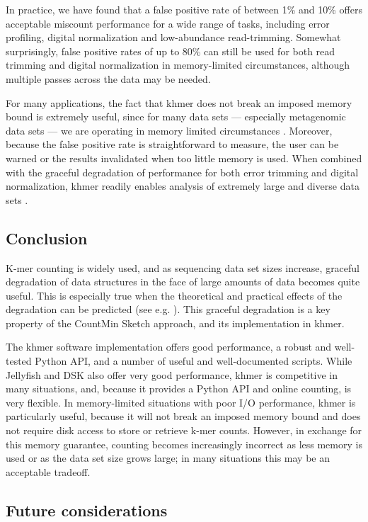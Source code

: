 \documentclass{article}
\begin{document}
In practice, we have found that a false positive rate of between 1\%
and 10\% offers acceptable miscount performance for a wide range of
tasks, including error profiling, digital normalization and
low-abundance read-trimming.  Somewhat surprisingly, false positive
rates of up to 80\% can still be used for both read trimming and
digital normalization in memory-limited circumstances, although
multiple passes across the data may be needed.

For many applications, the fact that khmer does not break an imposed
memory bound is extremely useful, since for many data sets ---
especially metagenomic data sets --- we are operating in
memory limited circumstances \cite{adina2013}.  Moreover, because the false positive
rate is straightforward to measure, the user can be warned or the
results invalidated when too little memory is used.  When combined
with the graceful degradation of performance for both error trimming
and digital normalization, khmer readily enables analysis of extremely
large and diverse data sets \cite{adina2013}.

\subsection{Conclusion}

K-mer counting is widely used, and as sequencing data set sizes
increase, graceful degradation of data structures in the face of large
amounts of data becomes quite useful.  This is especially true when
the theoretical and practical effects of the degradation can be
predicted (see e.g. \cite{Melsted2011, Pell2012, Roy2013}).  This
graceful degradation is a key property of the CountMin Sketch
approach, and its implementation in khmer.

The khmer software implementation offers good performance, a robust
and well-tested Python API, and a number of useful and well-documented
scripts.  While Jellyfish and DSK also offer very good performance,
khmer is competitive in many situations, and, because it provides a
Python API and online counting, is very flexible.  In memory-limited
situations with poor I/O performance, khmer is particularly useful,
because it will not break an imposed memory bound and does not require
disk access to store or retrieve k-mer counts.  However, in exchange
for this memory guarantee, counting becomes increasingly incorrect as
less memory is used or as the data set size grows large; in many
situations this may be an acceptable tradeoff.

\subsection{Future considerations}
\end{document}
